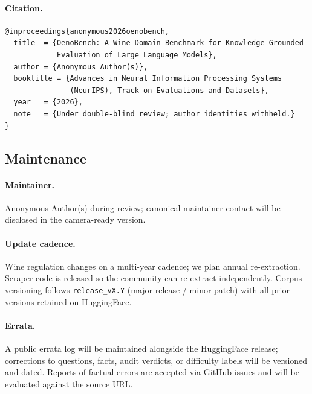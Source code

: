 \paragraph{Citation.}
\begin{verbatim}
@inproceedings{anonymous2026oenobench,
  title  = {OenoBench: A Wine-Domain Benchmark for Knowledge-Grounded
            Evaluation of Large Language Models},
  author = {Anonymous Author(s)},
  booktitle = {Advances in Neural Information Processing Systems
               (NeurIPS), Track on Evaluations and Datasets},
  year   = {2026},
  note   = {Under double-blind review; author identities withheld.}
}
\end{verbatim}

\subsection{Maintenance}
\paragraph{Maintainer.}
Anonymous Author(s) during review; canonical maintainer contact will
be disclosed in the camera-ready version.

\paragraph{Update cadence.}
Wine regulation changes on a multi-year cadence; we plan annual
re-extraction. Scraper code is released so the community can
re-extract independently. Corpus versioning follows
\texttt{release\_vX.Y} (major release / minor patch) with all prior
versions retained on HuggingFace.

\paragraph{Errata.}
A public errata log will be maintained alongside the HuggingFace
release; corrections to questions, facts, audit verdicts, or
difficulty labels will be versioned and dated. Reports of factual
errors are accepted via GitHub issues and will be evaluated against
the source URL.

